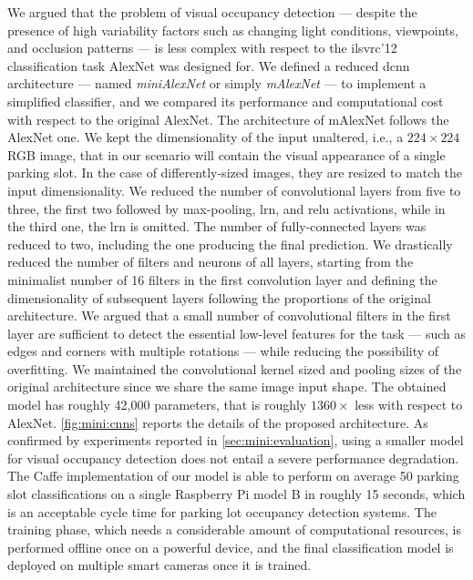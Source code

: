 We argued that the problem of visual occupancy detection --- despite the presence of high variability factors such as changing light conditions, viewpoints, and occlusion patterns --- is less complex with respect to the \gls{ilsvrc}'12 classification task AlexNet was designed for.
We defined a reduced \gls{dcnn} architecture --- named \emph{miniAlexNet} or simply \emph{mAlexNet} --- to implement a simplified classifier, and we compared its performance and computational cost with respect to the original AlexNet.
The architecture of mAlexNet follows the AlexNet one.
We kept the dimensionality of the input unaltered, i.e., a $224 \times 224$ RGB image, that in our scenario will contain the visual appearance of a single parking slot.
In the case of differently-sized images, they are resized to match the input dimensionality.
We reduced the number of convolutional layers from five to three, the first two followed by max-pooling, \gls{lrn}, and \gls{relu} activations, while in the third one, the \gls{lrn} is omitted.
The number of fully-connected layers was reduced to two, including the one producing the final prediction.
We drastically reduced the number of filters and neurons of all layers, starting from the minimalist number of 16 filters in the first convolution layer and defining the dimensionality of subsequent layers following the proportions of the original architecture.
We argued that a small number of convolutional filters in the first layer are sufficient to detect the essential low-level features for the task --- such as edges and corners with multiple rotations --- while reducing the possibility of overfitting.
We maintained the convolutional kernel sized and pooling sizes of the original architecture since we share the same image input shape.
The obtained model has roughly 42,000 parameters, that is roughly $1360 \times$ less with respect to AlexNet.
\ref{fig:mini:cnns} reports the details of the proposed architecture.
As confirmed by experiments reported in \ref{sec:mini:evaluation}, using a smaller model for visual occupancy detection does not entail a severe performance degradation.
The Caffe implementation of our model is able to perform on average 50 parking slot classifications on a single Raspberry Pi model B in roughly 15 seconds, which is an acceptable cycle time for parking lot occupancy detection systems. %
The training phase, which needs a considerable amount of computational resources, is performed offline once on a powerful device, and the final classification model is deployed on multiple smart cameras once it is trained.

